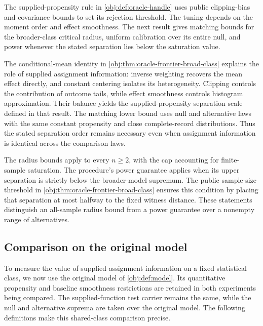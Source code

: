 The supplied-propensity rule  in \cref{obj:def:oracle-handle} uses public clipping-bias and covariance bounds to set its rejection threshold. The tuning depends on the moment order and effect smoothness. The next result gives matching bounds for the broader-class critical radius, uniform calibration over its entire null, and power whenever the stated separation lies below the saturation value.



The conditional-mean identity in \cref{obj:thm:oracle-frontier-broad-class} explains the role of supplied assignment information: inverse weighting recovers the mean effect directly, and constant centering isolates its heterogeneity. Clipping controls the contribution of outcome tails, while effect smoothness controls histogram approximation. Their balance yields the supplied-propensity separation scale  defined in that result. The matching lower bound uses null and alternative laws with the same constant propensity and close complete-record distributions. Thus the stated separation order remains necessary even when assignment information is identical across the comparison laws.

The radius bounds apply to every \(n\ge2\), with the cap accounting for finite-sample saturation. The procedure's power guarantee applies when its upper separation is strictly below the broader-model supremum. The public sample-size threshold in \cref{obj:thm:oracle-frontier-broad-class} ensures this condition by placing that separation at most halfway to the fixed witness distance. These statements distinguish an all-sample radius bound from a power guarantee over a nonempty range of alternatives.

\subsection{Comparison on the original model}

To measure the value of supplied assignment information on a fixed statistical class, we now use the original model of \cref{obj:def:model}. Its quantitative propensity and baseline smoothness restrictions are retained in both experiments being compared. The supplied-function test carrier remains the same, while the null and alternative suprema are taken over the original model. The following definitions make this shared-class comparison precise.

